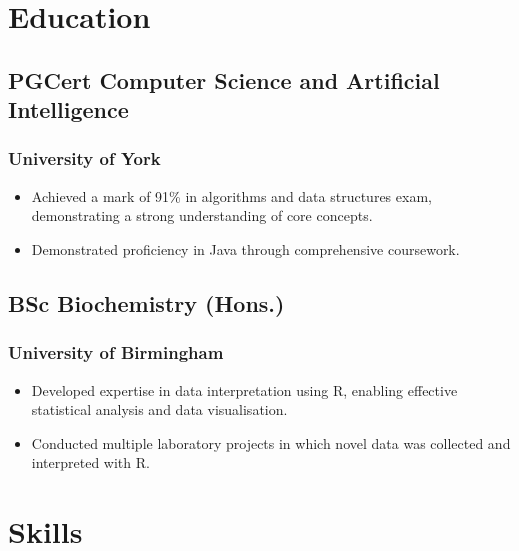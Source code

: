 \documentclass{article}
\begin{document}
  \section{Education}
  \subsection{PGCert Computer Science and Artificial Intelligence}
  \subsubsection{University of York}
  \hspace*{\fill}{\small Awarded 2023}
  \begin{itemize}[leftmargin=*]
    \setlength\itemsep{-2pt}
    \item Achieved a mark of 91\% in algorithms and data structures exam, demonstrating a strong understanding of core concepts.
    \item Demonstrated proficiency in Java through comprehensive coursework.
  \end{itemize}

  \subsection{BSc Biochemistry (Hons.)}
  \subsubsection{University of Birmingham}
  \hspace*{\fill}{\small Graduated 2019}
  \begin{itemize}[leftmargin=*]
    \setlength\itemsep{-2pt}
    \item Developed expertise in data interpretation using R, enabling effective statistical analysis and data visualisation.
    \item Conducted multiple laboratory projects in which novel data was collected and interpreted with R.
  \end{itemize}

  \section{Skills}
  \titleformat{\subsection}[runin]
  {\color{MyBlue}\rmfamily\bfseries}{}{0em}{}
\end{document}
